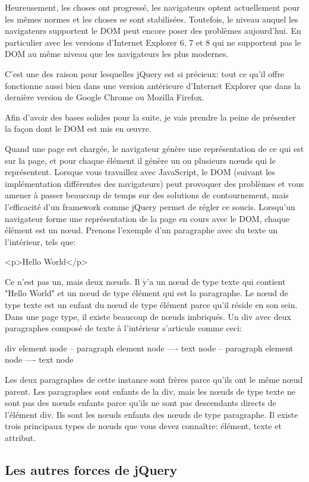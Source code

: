Heureusement, les choses ont progressé, les navigateurs optent actuellement pour les mêmes normes et les choses se sont stabilisées. Toutefois, le niveau auquel les navigateurs supportent le DOM peut encore poser des problèmes aujourd'hui. En particulier avec les versions d'Internet Explorer 6, 7 et 8 qui ne supportent pas le DOM au même niveau que les navigateurs les plus modernes.

C'est une des raison pour lesquelles jQuery est si précieux: tout ce qu'il offre fonctionne aussi bien dans une version antérieure d'Internet Explorer que dans la dernière version de Google Chrome ou Mozilla Firefox.

Afin d'avoir des bases solides pour la suite, je vais prendre la peine de présenter la façon dont le DOM est mis en œuvre.

Quand une page est chargée, le navigateur génère une représentation de ce qui est sur la page, et pour chaque élément il génère un ou plusieurs nœuds qui le représentent. Lorsque vous travaillez avec JavaScript, le DOM (suivant les implémentation différentes des navigateurs) peut provoquer des problèmes et vous amener à passer beaucoup de temps sur des solutions de contournement, mais l'efficacité d'un framework comme jQuery permet de régler ce soucis.
Lorsqu'un navigateur forme une représentation de la page en cours avec le DOM, chaque élément est un nœud. Prenons l'exemple d'un paragraphe avec du texte un l'intérieur, tels que:

<p>Hello World</p>

Ce n'est pas un, mais deux nœuds. Il y'a un nœud de type texte qui contient "Hello World" et un nœud de type élément qui est la paragraphe. Le nœud de type texte est un enfant du nœud de type élément parce qu'il réside en son sein. Dans une page type, il existe beaucoup de nœuds imbriqués. Un div avec deux paragraphes composé de texte à l'intérieur s'articule comme ceci:

div element node
-- paragraph element node
---- text node
-- paragraph element node
---- text node

Les deux paragraphes de cette instance sont frères parce qu'ils ont le même nœud parent. Les paragraphes sont enfants de la div, mais les nœuds de type texte ne sont pas des nœuds enfants parce qu'ils ne sont pas descendants directs de l'élément div.
Ils sont les nœuds enfants des nœuds de type paragraphe. Il existe trois principaux types de nœuds que vous devez connaître: élément, texte et attribut.

\subsection{Les autres forces de jQuery }

